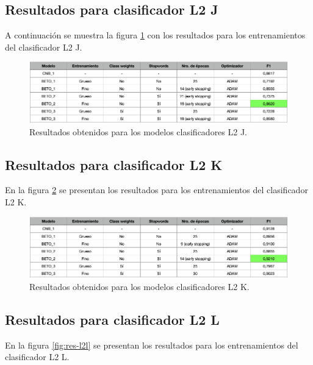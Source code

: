\subsection{Resultados para clasificador L2 J}

A continuación se muestra la figura \ref{fig:res-l2j} con los resultados para los entrenamientos del clasificador L2 J.

\begin{figure}[htbp]
	\centering
	\includegraphics[width=1\textwidth]{./Figures/cap4-resultados-l2j.png}
	\caption{Resultados obtenidos para los modelos clasificadores L2 J.}
	\label{fig:res-l2j}
\end{figure}

\subsection{Resultados para clasificador L2 K}

En la figura \ref{fig:res-l2k} se presentan los resultados para los entrenamientos del clasificador L2 K.

\begin{figure}[htbp]
	\centering
	\includegraphics[width=1\textwidth]{./Figures/cap4-resultados-l2k.png}
	\caption{Resultados obtenidos para los modelos clasificadores L2 K.}
	\label{fig:res-l2k}
\end{figure}

\subsection{Resultados para clasificador L2 L}

En la figura \ref{fig:res-l2l} se presentan los resultados para los entrenamientos del clasificador L2 L.

